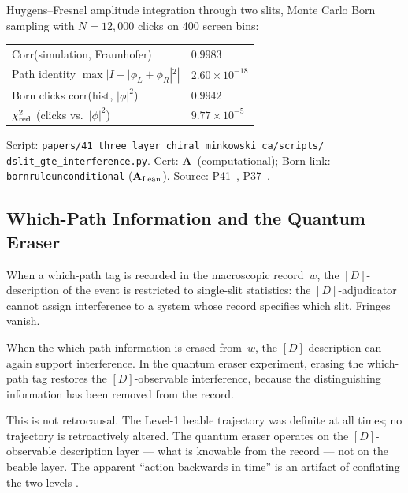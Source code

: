 \documentclass[11pt,openany]{book}
\theoremstyle{remark}
\newcommand{\lean}[1]{%
  \penalty-100
  \begingroup\def\_{\textunderscore\allowbreak}\texttt{#1}\endgroup}
\newcommand{\CatA}{\textbf{A}}
\newcommand{\CatAL}{\ensuremath{\textbf{A}_{\rm Lean}}}
\begin{document}
\begin{tcolorbox}[colback=orange!5,colframe=orange!60,
  title={Result: Double-Slit Certificate (75-DSLIT, \CatA)}]
  Huygens--Fresnel amplitude integration through two slits, Monte Carlo Born sampling
  with $N = 12{,}000$ clicks on 400 screen bins:

  \medskip
  {\small
  \begin{tabularx}{\linewidth}{@{}>{\RaggedRight}p{4.8cm}l@{}}
    Corr(simulation, Fraunhofer) & $0.9983$ \\
    Path identity $\max|I - |\phi_L+\phi_R|^2|$ & $2.60 \times 10^{-18}$ \\
    Born clicks corr(hist, $|\phi|^2$) & $0.9942$ \\
    $\chi^2_{\rm red}$ (clicks vs.\ $|\phi|^2$) & $9.77 \times 10^{-5}$ \\
  \end{tabularx}
  }

  \medskip
  Script: \texttt{papers/41\_three\_layer\_chiral\_minkowski\_ca/scripts/%
dslit\_gte\_interference.py}.
  Cert: \CatA\ (computational); Born link: \lean{born\_rule\_unconditional} (\CatAL).
  Source: P41~\cite{SpivackCMCA}, P37~\cite{SpivackQMFromR110}.
\end{tcolorbox}

\subsection*{Which-Path Information and the Quantum Eraser}

When a which-path tag is recorded in the macroscopic record~$w$, the $[D]$-description
of the event is restricted to single-slit statistics: the $[D]$-adjudicator cannot assign
interference to a system whose record specifies which slit.  Fringes vanish.

When the which-path information is erased from~$w$, the $[D]$-description can again
support interference.  In the quantum eraser experiment, erasing the which-path tag
restores the $[D]$-observable interference, because the distinguishing information has
been removed from the record.

This is not retrocausal.  The Level-1 beable trajectory was definite at all times; no
trajectory is retroactively altered.  The quantum eraser operates on the $[D]$-observable
description layer --- what is knowable from the record --- not on the beable layer.
The apparent ``action backwards in time'' is an artifact of conflating the two levels
\cite{SpivackCompleteness}.
\end{document}
